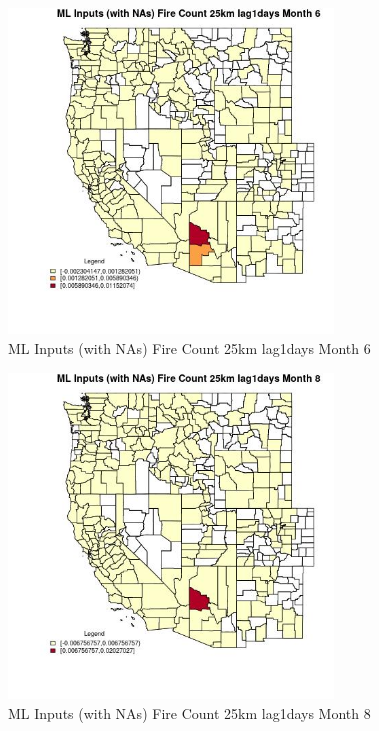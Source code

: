 \begin{figure} 
\centering  
\includegraphics[width=0.77\textwidth]{Code_Outputs/Report_ML_input_PM25_Step4_part_e_de_duplicated_aves_compiled_2019-05-21wNAs_CountyFire_Count_25km_lag1daysmedianMonth6.jpg} 
\caption{\label{fig:Report_ML_input_PM25_Step4_part_e_de_duplicated_aves_compiled_2019-05-21wNAsCountyFire_Count_25km_lag1daysmedianMonth6}ML Inputs (with NAs) Fire Count 25km lag1days Month 6} 
\end{figure} 
 

\begin{figure} 
\centering  
\includegraphics[width=0.77\textwidth]{Code_Outputs/Report_ML_input_PM25_Step4_part_e_de_duplicated_aves_compiled_2019-05-21wNAs_CountyFire_Count_25km_lag1daysmedianMonth8.jpg} 
\caption{\label{fig:Report_ML_input_PM25_Step4_part_e_de_duplicated_aves_compiled_2019-05-21wNAsCountyFire_Count_25km_lag1daysmedianMonth8}ML Inputs (with NAs) Fire Count 25km lag1days Month 8} 
\end{figure} 
 

